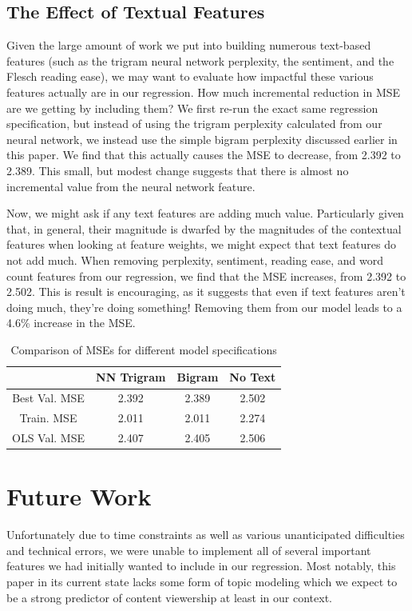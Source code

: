 \documentclass[fleqn,12pt]{SelfArx} %
\begin{document}
\subsection{The Effect of Textual Features}

Given the large amount of work we put into building numerous text-based features (such as the trigram neural network perplexity, the sentiment, and the Flesch reading ease), we may want to evaluate how impactful these various features actually are in our regression. How much incremental reduction in MSE are we getting by including them? We first re-run the exact same regression specification, but instead of using the trigram perplexity calculated from our neural network, we instead use the simple bigram perplexity discussed earlier in this paper. We find that this actually causes the MSE to decrease, from 2.392 to 2.389. This small, but modest change suggests that there is almost no incremental value from the neural network feature.

Now, we might ask if any text features are adding much value. Particularly given that, in general, their magnitude is dwarfed by the magnitudes of the contextual features when looking at feature weights, we might expect that text features do not add much. When removing perplexity, sentiment, reading ease, and word count features from our regression, we find that the MSE increases, from 2.392 to 2.502. This is result is encouraging, as it suggests that even if text features aren't doing much, they're doing something! Removing them from our model leads to a 4.6\% increase in the MSE.

\begin{table}[hbt]
\caption{Comparison of MSEs for different model specifications}
\centering
\begin{tabular}{cccc}
\toprule
  & NN Trigram & Bigram & No Text\\
\midrule
Best Val. MSE & 2.392 & 2.389 &  2.502 \\
Train. MSE & 2.011 & 2.011 &  2.274 \\
OLS Val. MSE & 2.407 & 2.405 & 2.506 \\ 
\bottomrule
\end{tabular}
\end{table}

\section{Future Work}
Unfortunately due to time constraints as well as various unanticipated difficulties and technical errors, we were unable to implement all of several important features we had initially wanted to include in our regression. Most notably, this paper in its current state lacks some form of topic modeling which we expect to be a strong predictor of content viewership at least in our context. 
\end{document}
